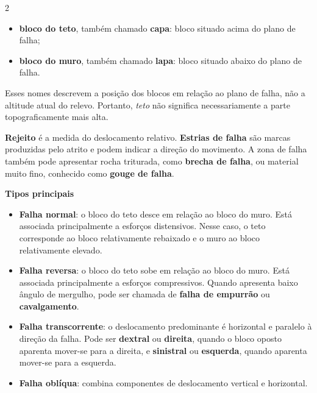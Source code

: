 \documentclass[11pt,a4paper,twoside,openany]{book}
\newenvironment{verbete}[1]{%
  \needspace{6\baselineskip}
  \markboth{#1}{#1}
  \par\addvspace{0.55em}
  \noindent{\sffamily\bfseries\large\color{uerjblue}#1}\par\nobreak
  \vspace{0.15em}
}{%
  \par\addvspace{0.65em}
}
\newcommand{\termo}[1]{\textbf{#1}}
\begin{document}
\begin{multicols*}{2}
\begin{verbete}{Falha}
\begin{itemize}
  \item \termo{bloco do teto}, também chamado \termo{capa}: bloco situado acima do plano de falha;
  \item \termo{bloco do muro}, também chamado \termo{lapa}: bloco situado abaixo do plano de falha.
\end{itemize}

Esses nomes descrevem a posição dos blocos em relação ao plano de falha, não a altitude atual do relevo. Portanto, \emph{teto} não significa necessariamente a parte topograficamente mais alta.

\termo{Rejeito} é a medida do deslocamento relativo. \termo{Estrias de falha} são marcas produzidas pelo atrito e podem indicar a direção do movimento. A zona de falha também pode apresentar rocha triturada, como \termo{brecha de falha}, ou material muito fino, conhecido como \termo{gouge de falha}.

\textbf{Tipos principais}

\begin{itemize}
  \item \termo{Falha normal}: o bloco do teto desce em relação ao bloco do muro. Está associada principalmente a esforços distensivos. Nesse caso, o teto corresponde ao bloco relativamente rebaixado e o muro ao bloco relativamente elevado.
  \item \termo{Falha reversa}: o bloco do teto sobe em relação ao bloco do muro. Está associada principalmente a esforços compressivos. Quando apresenta baixo ângulo de mergulho, pode ser chamada de \termo{falha de empurrão} ou \termo{cavalgamento}.
  \item \termo{Falha transcorrente}: o deslocamento predominante é horizontal e paralelo à direção da falha. Pode ser \termo{dextral} ou \termo{direita}, quando o bloco oposto aparenta mover-se para a direita, e \termo{sinistral} ou \termo{esquerda}, quando aparenta mover-se para a esquerda.
  \item \termo{Falha oblíqua}: combina componentes de deslocamento vertical e horizontal.
\end{itemize}

\begin{center}
\end{center}
\end{verbete}
\end{multicols*}
\end{document}
